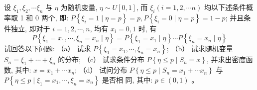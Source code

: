 \documentclass[a4,10pt]{ctexart}
\begin{document}
\begin{qj}

\end{qj}


    
    \begin{ti}{8}{}

        设 $\xi_1, \xi_2, \cdots \xi_n$ 与 $\eta$ 为随机变量, $\eta \sim U[0,1]$, 而 $\xi_i(i=1,2, \cdots n)$ 均以下述条件概率取 1 和 0 两个, 即: $P\left\{\xi_i=1 \mid \eta=p\right\}=p, P\left\{\xi_i=0 \mid \eta=p\right\}=1-p$; 并且条件独立, 即对于 $i=1,2, \cdots, n$, 均有 $x_i=0,1$ 时, 有
        $$
        P\left\{\xi_1=x_1, \cdots, \xi_n=x_n \mid \eta\right\}=P\left\{\xi_1=x_1 \mid \eta\right\} \cdots P\left\{\xi_n=x_n \mid \eta\right\}
        $$
        试回答以下问题:
        （a） 试求 $P\left\{\xi_1=x_1, \cdots, \xi_n=x_n\right\}$;
        （b） 试求随机变量 $S_n=\xi_1+\cdots+\xi_n$ 的分布;
        （c） 试求条件分布 $P\left\{\eta \leq p \mid S_n=x\right\}$, 并求出密度函数, 其中: $x=x_1+\cdots x_n$;
        （d） 试问分布 $P\left\{\eta \leq p \mid S_n=x_1+\cdots x_n\right\}$ 与 $P\left\{\eta \leq p \mid \xi_1=x_1, \cdots, \xi_n=x_n\right\}$ 是否相 同, 其中: $p \in(0,1)$ 。


    \end{ti}




   
    


    

    





              
\end{document}
